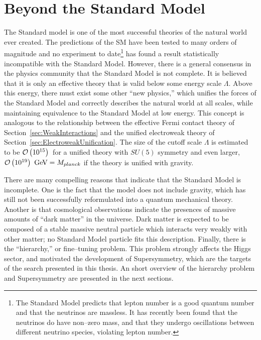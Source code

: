 \section{Beyond the Standard Model}
\label{sec:BSM} The Standard model is one of the most successful theories of the
natural world ever created.  The predictions of the SM have been tested to many
orders of magnitude and no experiment to date\footnote{The Standard Model
predicts that lepton number is a good quantum number and that the neutrinos are
massless.  It has recently been found that the neutrinos do have non--zero mass,
and that they undergo oscillations between different neutrino species, violating
lepton number.} has found a result statistically incompatible with the Standard
Model.  However, there is a general consensus in the physics community that the
Standard Model is not complete. It is believed that it is only an effective theory
that is valid below some energy scale $\Lambda$.  Above this energy, there must exist
some other ``new physics,'' which unifies the forces of the Standard Model and
correctly describes the natural world at all scales, while maintaining
equivalence to the Standard Model at low energy.  This concept is analogous to
the relationship between the effective Fermi contact theory of
Section~\ref{sec:WeakInteractions} and the unified electroweak theory of
Section~\ref{sec:ElectroweakUnification}. The size of the cutoff scale $\Lambda$
is estimated~\cite{Morii:SMandBSM} to be $\mbox{\ensuremath{\mathcal{O}\left(10^{15}\right)}}$~\GeV for a unified theory
with $SU(5)$ symmetry and even larger, $\mbox{\ensuremath{\mathcal{O}\left(10^{19}\right)}}~\,\text{Ge\hspace{-.08em}V} = M_{planck}$ if the
theory is unified with gravity.  

There are many compelling reasons that indicate
that the Standard Model is incomplete.  One is the fact that the model does not
include gravity, which has still not been successfully reformulated into a quantum
mechanical theory.  Another is that cosmological observations indicate the
presences of massive amounts of ``dark matter'' in the universe.  Dark matter is
expected to be composed of a stable massive neutral particle which interacts
very weakly with other matter; no Standard Model particle fits this description.
Finally, there is the ``hierarchy,'' or fine--tuning problem.  This problem
strongly affects the Higgs sector, and motivated the development of
Supersymmetry, which are the targets of the search presented in this thesis.  An
short overview of the hierarchy problem and Supersymmetry are presented in the
next sections.

